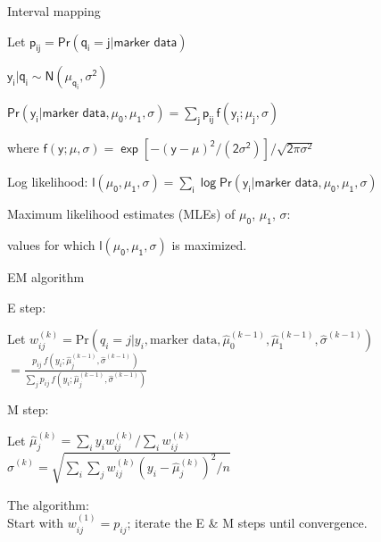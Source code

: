 \documentclass[aspectratio=169,12pt,t]{beamer}
\begin{document}
\begin{frame}[c]{Interval mapping}


  \bbi
  \itemsep18pt

\item[] Let $\mathsf{p_{ij} = \text{Pr}(q_i = j | \text{marker data})}$

\item[] $\mathsf{y_i | q_i \sim N(\mu_{q_i},\sigma^2)}$

\item[] $\mathsf{\text{Pr}(y_i | \text{marker data},\mu_0,\mu_1,\sigma) =
\sum_j p_{ij} \, f(y_i; \mu_j,\sigma)}$

\qquad where $\mathsf{f(y; \mu,\sigma)= \exp[-(y-\mu)^2/(2\sigma^2)] / \sqrt{2 \pi
\sigma^2}}$


\item[] {\hilit Log likelihood}: \hspace{5mm}
$\mathsf{l(\mu_0,\mu_1,\sigma) = \sum_i \log \text{Pr}(y_i | \text{marker
data},\mu_0,\mu_1,\sigma)}$

\item[] Maximum likelihood estimates ({\hilit MLEs})
of $\mathsf{\mu_0}$, $\mathsf{\mu_1}$, $\mathsf{\sigma}$:

\qquad values for which $\mathsf{l(\mu_0,\mu_1,\sigma)}$ is maximized.
\ei

\end{frame}




\begin{frame}{EM algorithm}


\vspace*{-8mm}
\bbi

\item[] {\hilit E step}:

\qquad Let \hspace{5mm} $w_{ij}^{(k)} = \text{Pr}(q_i = j |
y_i,\text{marker data},\hat{\mu}_0^{(k-1)},
\hat{\mu}_1^{(k-1)},\hat{\sigma}^{(k-1)})$ \\[12pt]

\hspace{29mm} $ = \frac{p_{ij} \, f(y_i; \hat{\mu}_j^{(k-1)},\hat{\sigma}^{(k-1)})}{ \sum_j p_{ij} \, f(y_i; \hat{\mu}_j^{(k-1)},\hat{\sigma}^{(k-1)})}$


\item[] {\hilit M step}:

\qquad Let \hspace{5mm} $\hat{\mu}_j^{(k)} = \sum_i y_i w_{ij}^{(k)} /
\sum_i w_{ij}^{(k)}$ \\[12pt]

\hspace{20mm} $\hat{\sigma}^{(k)} = \sqrt{ \sum_i \sum_j w_{ij}^{(k)} (y_i-\hat{\mu}_j^{(k)})^2/n}$


\item[] {\hilit The algorithm}: \\[6pt]

\qquad Start with $w_{ij}^{(1)} = p_{ij}$; iterate the E \& M steps until convergence.

\ei

\end{frame}
\end{document}
